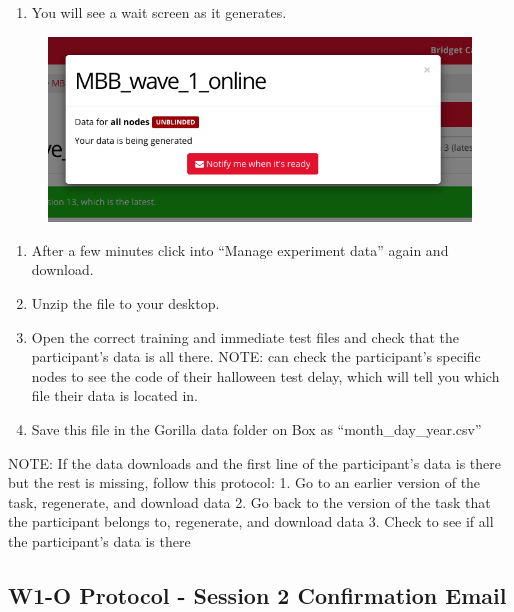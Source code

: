 \documentclass[]{book}
\providecommand{\tightlist}{%
  \setlength{\itemsep}{0pt}\setlength{\parskip}{0pt}}
\begin{document}
\begin{enumerate}
\def\labelenumi{\arabic{enumi}.}
\setcounter{enumi}{4}
\tightlist
\item
  You will see a wait screen as it generates.
\end{enumerate}

\begin{figure}
\centering
\includegraphics{images/gorilla/9.png}
\caption{}
\end{figure}

\begin{enumerate}
\def\labelenumi{\arabic{enumi}.}
\setcounter{enumi}{5}
\tightlist
\item
  After a few minutes click into ``Manage experiment data'' again and download.
\item
  Unzip the file to your desktop.
\item
  Open the correct training and immediate test files and check that the participant's data is all there. NOTE: can check the participant's specific nodes to see the code of their halloween test delay, which will tell you which file their data is located in.
\item
  Save this file in the Gorilla data folder on Box as ``month\_day\_year.csv''
\end{enumerate}

NOTE: If the data downloads and the first line of the participant's data is there but the rest is missing, follow this protocol:
1. Go to an earlier version of the task, regenerate, and download data
2. Go back to the version of the task that the participant belongs to, regenerate, and download data
3. Check to see if all the participant's data is there

\hypertarget{w1-o-protocol---session-2-confirmation-email}{%
\subsection{W1-O Protocol - Session 2 Confirmation Email}\label{w1-o-protocol---session-2-confirmation-email}}
\end{document}
